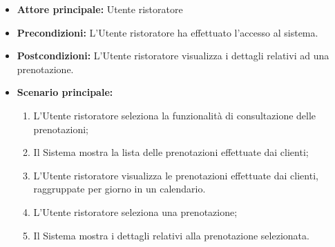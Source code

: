 \label{usecase:Consultazione delle prenotazioni da parte del business}
\begin{itemize}
	\item \textbf{Attore principale:} Utente ristoratore

	\item \textbf{Precondizioni:} L'Utente ristoratore ha effettuato l'accesso
	      al sistema.

	\item \textbf{Postcondizioni:}
	      L'Utente ristoratore visualizza i dettagli relativi ad una prenotazione.

	\item \textbf{Scenario principale:}
	      \begin{enumerate}
		      \item L'Utente ristoratore seleziona la funzionalità di
		            consultazione delle prenotazioni;

		      \item Il Sistema mostra la lista delle prenotazioni effettuate
		            dai clienti;

		      \item L'Utente ristoratore visualizza le prenotazioni
		            effettuate dai clienti, raggruppate per giorno in un
		            calendario.

		      \item L'Utente ristoratore seleziona una prenotazione;

		      \item Il Sistema mostra i dettagli relativi alla prenotazione
		            selezionata.
	      \end{enumerate}
\end{itemize}
